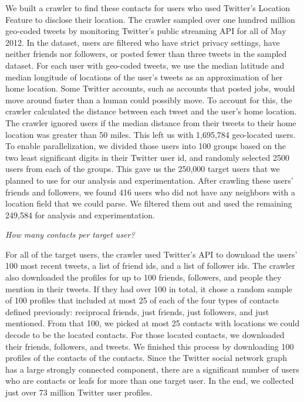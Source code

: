 We built a crawler to find these contacts for users who used Twitter's Location
Feature to disclose their location.
The crawler sampled over one hundred million geo-coded tweets by monitoring
Twitter's public streaming API for all of May 2012.
In the dataset, users are filtered who have strict privacy settings, have
neither friends nor followers, or posted fewer than three tweets in the sampled
dataset.
For each user with geo-coded tweets, we use the median latitude and median
longitude of locations of the user's tweets as an approximation of her home
location.
Some Twitter accounts, such as accounts that posted jobs, would
move around faster than a human could possibly move.
To account for this, the crawler calculated the distance between each tweet and
the user's home location.
The crawler ignored users if the median distance from their tweets to their
home location was greater than 50 miles.
This left us with 1,695,784 geo-located users.
To enable parallelization, we divided those users into 100 groups based on
the two least significant digits in their Twitter user id, and randomly selected
2500 users from each of the groups.
%
This gave us the 250,000 target users that we planned to use for our
analysis and experimentation.
%
After crawling these users' friends and followers, we found 416 users who did
not have any neighbors with a location field that we could parse.
%
We filtered them out and used the remaining 249,584 for analysis and
experimentation.


\emph{How many contacts per target user?}

For all of the target users, the crawler used Twitter's API to download
the users' 100 most recent tweets, a list of friend ids, and a list of follower ids.
The crawler also downloaded the profiles for up to 100 friends, followers, and
people they mention in their tweets.
%
If they had over 100 in total, it chose a random sample of 100 profiles that
included at most 25 of each of the four types of contacts defined previously:
reciprocal friends, just friends, just followers, and just mentioned.
%
From that 100, we picked at most 25 contacts with locations we could decode to
be the located contacts. For those located contacts, we downloaded their
friends, followers, and tweets.
%
We finished this process by downloading 100 profiles of the contacts of the
contacts.
%
Since the Twitter social network graph has a large strongly connected
component, there are a significant number of users who are contacts or leafs for
more than one target user.
%
In the end, we collected just over 73 million Twitter user profiles.

